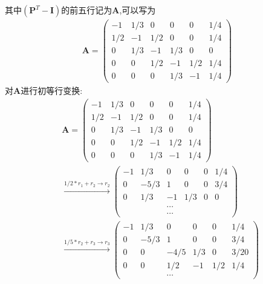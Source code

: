 \begin{enumerate}
	      其中\((\mathbf{P}^T-\mathbf{I})\)的前五行记为\(\mathbf{A}\),可以写为
	      \begin{align*}
		      \mathbf{A}=
		      \begin{pmatrix}
			      -1  & 1/3 & 0   & 0   & 0   & 1/4 \\
			      1/2 & -1  & 1/2 & 0   & 0   & 1/4 \\
			      0   & 1/3 & -1  & 1/3 & 0   & 0   \\
			      0   & 0   & 1/2 & -1  & 1/2 & 1/4 \\
			      0   & 0   & 0   & 1/3 & -1  & 1/4
		      \end{pmatrix}
	      \end{align*}
	      对\(\mathbf{A}\)进行初等行变换:
	      \begin{align*}
		       & \mathbf{A}=
		      \begin{pmatrix}
			      -1  & 1/3 & 0   & 0   & 0   & 1/4 \\
			      1/2 & -1  & 1/2 & 0   & 0   & 1/4 \\
			      0   & 1/3 & -1  & 1/3 & 0   & 0   \\
			      0   & 0   & 1/2 & -1  & 1/2 & 1/4 \\
			      0   & 0   & 0   & 1/3 & -1  & 1/4
		      \end{pmatrix}                                  \\
		       & \overset{1/2*r_1+r_2\rightarrow r_2}{\longrightarrow }
		      \begin{pmatrix}
			      -1 & 1/3  & 0      & 0    & 0 & 1/4 \\
			      0  & -5/3 & 1      & 0    & 0 & 3/4 \\
			      0  & 1/3  & -1     & 1 /3 & 0 & 0   \\
			         &      & \cdots &      &         \\
			         &      & \cdots &      &
		      \end{pmatrix}                                \\
		       & \overset{1/5*r_2+r_3\rightarrow r_3}{\longrightarrow }
		      \begin{pmatrix}
			      -1 & 1/3  & 0      & 0   & 0   & 1/4  \\
			      0  & -5/3 & 1      & 0   & 0   & 3/4  \\
			      0  & 0    & -4/5   & 1/3 & 0   & 3/20 \\
			      0  & 0    & 1/2    & -1  & 1/2 & 1/4  \\
			         &      & \cdots &     &

\end{pmatrix}
\end{align*}
\end{enumerate}
